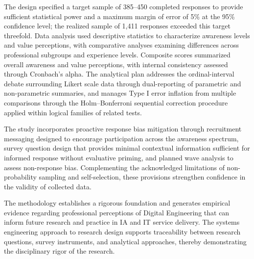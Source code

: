 The design specified a target sample of 385--450 completed responses to provide sufficient statistical power and a maximum margin of error of 5\% at the 95\% confidence level; the realized sample of 1{,}411 responses exceeded this target threefold. Data analysis used descriptive statistics to characterize awareness levels and value perceptions, with comparative analyses examining differences across professional subgroups and experience levels. Composite scores summarized overall awareness and value perceptions, with internal consistency assessed through Cronbach's alpha. The analytical plan addresses the ordinal-interval debate surrounding Likert scale data through dual-reporting of parametric and non-parametric summaries, and manages Type I error inflation from multiple comparisons through the Holm--Bonferroni sequential correction procedure applied within logical families of related tests.

The study incorporates proactive response bias mitigation through recruitment messaging designed to encourage participation across the awareness spectrum, survey question design that provides minimal contextual information sufficient for informed response without evaluative priming, and planned wave analysis to assess non-response bias. Complementing the acknowledged limitations of non-probability sampling and self-selection, these provisions strengthen confidence in the validity of collected data.

The methodology establishes a rigorous foundation and generates empirical evidence regarding professional perceptions of Digital Engineering that can inform future research and practice in IA and IT service delivery. The systems engineering approach to research design supports traceability between research questions, survey instruments, and analytical approaches, thereby demonstrating the disciplinary rigor of the research.